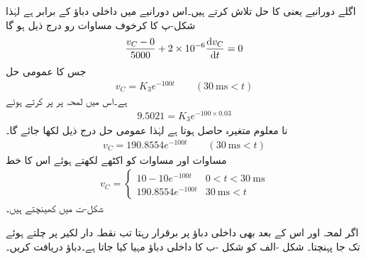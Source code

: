 اگلے دورانیے یعنی  کا حل تلاش کرتے ہیں۔اس دورانیے میں داخلی دباؤ  کے برابر ہے لہٰذا شکل-پ کا کرخوف مساوات رو درج ذیل ہو گا
\begin{align*}
\frac{v_C-0}{5000}+2\times10^{-6}\frac{\dif v_C}{\dif t}=0
\end{align*}
جس کا عمومی حل
\begin{align*}
v_C=K_3e^{-100t} \quad \quad (\SI{30}{\milli\second}< t)
\end{align*}
ہے۔اس میں لمحہ  پر  پر کرتے  ہوئے
\begin{align*}
9.5021=K_3 e^{-100\times 0.03}
\end{align*}
نا معلوم متغیرہ  حاصل ہوتا ہے لہٰذا عمومی حل درج ذیل لکھا جائے گا۔
\begin{align}\label{مساوات_عارضی_مستطیل_مثال_حل_ب}
v_C=190.8554e^{-100t} \quad \quad (\SI{30}{\milli\second}< t)
\end{align}
مساوات  اور مساوات  کو اکٹھے لکھتے  ہوئے اس کا خط
\begin{align}
v_C=
\begin{cases}
10-10e^{-100t}& 0<t<\SI{30}{\milli\second}\\
190.8554e^{-100t} & \SI{30}{\milli\second}< t
\end{cases}
\end{align}
شکل-ت میں کھینچتے ہیں۔

اگر لمحہ  اور اس کے بعد بھی داخلی دباؤ  پر برقرار رہتا تب  نقطہ دار لکیر پر چلتے ہوئے  تک جا پہنچتا۔    
شکل -الف کو شکل -ب کا داخلی دباؤ مہیا کیا جاتا ہے۔دباؤ  دریافت کریں۔

